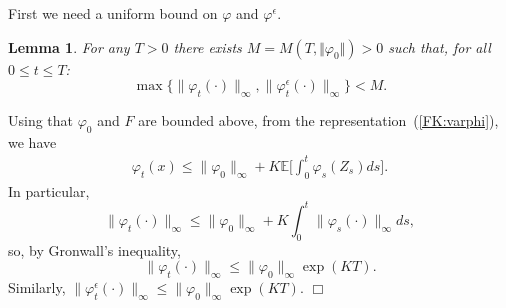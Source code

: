 \documentclass[12pt]{article}
\newenvironment {proof}{{\noindent\bf Proof }}{\hfill $\Box$ \medskip}
\newtheorem{lemma}[theorem]{Lemma}
\newcommand{\IE}{\mathbb E}
\numberwithin{equation}{section}
\begin{document}
First we need a uniform bound on $\varphi$ and $\varphi^\epsilon$.  
\begin{lemma} 
\label{BoundednessVarphis}
For any $T>0$ there exists $M = M(T, \Vert \varphi_0 \Vert) >0$ such that, 
for all $0 \leq t \leq T$:
\[ \max\{ \| \varphi_t(\cdot) \|_\infty, \| \varphi^\epsilon_t(\cdot) \|_\infty\} 
< M.
 \]
\end{lemma}
\begin{proof}
Using that $\varphi_0$ and $F$ are bounded above, from the
representation~(\ref{FK:varphi}), we have
\begin{align*}
\varphi_t(x) \leq \| \varphi_0 \|_\infty + 
K \IE\Big[\int_0^t \varphi_s(Z_s) ds\Big].
\end{align*}
In particular, %
\[ \| \varphi_t(\cdot) \|_\infty \leq \| \varphi_0 \|_\infty
+  K \int_0^t \| \varphi_s(\cdot) \|_\infty ds, \]
so, by Gronwall's inequality,
\[ \| \varphi_t(\cdot) \|_\infty \leq \| \varphi_0 \|_\infty \exp\left( K T \right). \]
Similarly,
$\| \varphi^\epsilon_t(\cdot) \|_{\infty} \leq \| \varphi_0 \|_\infty \exp\left( K T \right) $.
\end{proof}
\end{document}
